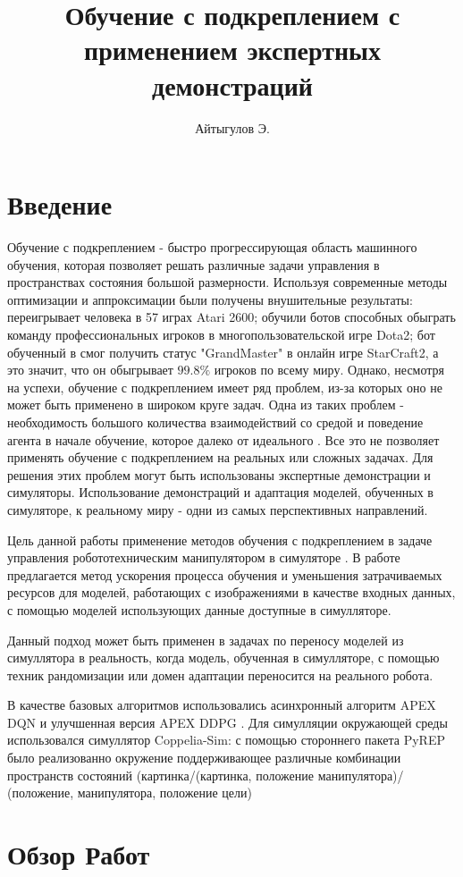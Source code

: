 \documentclass{mipt-thesis-bs}
\title{Обучение с подкреплением с применением экспертных демонстраций}
\author{Айтыгулов Э.}
\begin{document}
\frontmatter
\titlecontents

\chapter{Введение}
Обучение с подкреплением - быстро прогрессирующая область машинного обучения, которая позволяет решать различные задачи управления в пространствах состояния большой размерности. Используя современные методы оптимизации и аппроксимации были получены внушительные результаты: \cite{Agent-57} переигрывает человека в 57 играх Atari 2600; \cite{OpenAI}  обучили ботов способных обыграть команду профессиональных игроков в многопользовательской игре Dota2; бот обученный в \cite{DeepMind} смог получить статус "GrandMaster" в онлайн игре StarCraft2, а это значит, что он обыгрывает $99.8\%$ игроков по всему миру. Однако, несмотря на успехи, обучение с подкреплением имеет ряд проблем, из-за которых оно не может быть применено в широком круге задач. Одна из таких проблем - необходимость большого количества взаимодействий со средой и поведение агента в начале обучение, которое далеко от идеального . Все это не позволяет применять обучение с подкреплением на реальных или сложных задачах. Для решения этих проблем могут быть использованы экспертные демонстрации и симуляторы. Использование демонстраций и адаптация моделей, обученных в симуляторе, к реальному миру - одни из самых перспективных направлений.

Цель данной работы применение методов обучения с подкреплением в задаче управления робототехническим манипулятором в симуляторе \cite{}. В работе предлагается метод ускорения процесса обучения и уменьшения затрачиваемых ресурсов для моделей, работающих с изображениями в качестве входных данных, с помощью моделей использующих данные доступные в симулляторе. 

Данный подход может быть применен в задачах по переносу моделей из симуллятора в реальность, когда модель, обученная в симулляторе, с помощью техник рандомизации или домен адаптации переносится на реального робота.

В качестве базовых алгоритмов использовались асинхронный алгоритм APEX DQN \cite{} и улучшенная версия APEX DDPG  \cite{}. Для симулляции окружающей среды использовался симуллятор Coppelia-Sim: с помощью стороннего пакета PyREP было реализованно окружение поддерживающее различные комбинации пространств состояний (картинка/(картинка, положение манипулятора)/ (положение, манипулятора, положение цели)

\chapter{Обзор Работ}
\end{document}

